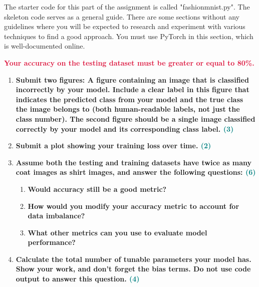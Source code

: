 \documentclass[a4paper]{article}
\begin{document}
\begin{sloppypar}
\noindent The starter code for this part of the assignment is called "fashionmnist.py". The skeleton
code serves as a general guide. There are some sections without any guidelines where
you will be expected to research and experiment with various techniques to find a good
approach. You must use PyTorch in this section, which is well-documented online.

\vspace{\baselineskip}

\noindent \textbf{\textcolor{crimson}{Your accuracy on the testing dataset must be greater or equal to 80\%.}}

\vspace{\baselineskip}

\begin{enumerate}[start=4,label=Q\arabic*,left=0pt]
    \item \textbf{Submit two figures: A figure containing an image that is classified incorrectly by your
    model. Include a clear label in this figure that indicates the predicted class from your
    model and the true class the image belongs to (both human-readable labels, not just the
    class number). The second figure should be a single image classified correctly by your
    model and its corresponding class label. \hfill \textcolor{teal}{(3)}}

    \par

    \item \textbf{Submit a plot showing your training loss over time. \hfill \textcolor{teal}{(2)}}

    \par 

    \item \textbf{Assume both the testing and training datasets have twice as many coat images as
    shirt images, and answer the following questions: \hfill \textcolor{teal}{(6)}}
    \begin{enumerate}
        \item \textbf{Would accuracy still be a good metric?}
        \item \textbf{How would you modify your accuracy metric to account for data imbalance?}
        \item \textbf{What other metrics can you use to evaluate model performance?}
    \end{enumerate}

    \par 

    \item \textbf{Calculate the total number of tunable parameters your model has. Show your work,
    and don’t forget the bias terms. Do not use code output to answer this question. \hfill \textcolor{teal}{(4)}}

    \par 

\end{enumerate}
\end{sloppypar}



\end{document}
